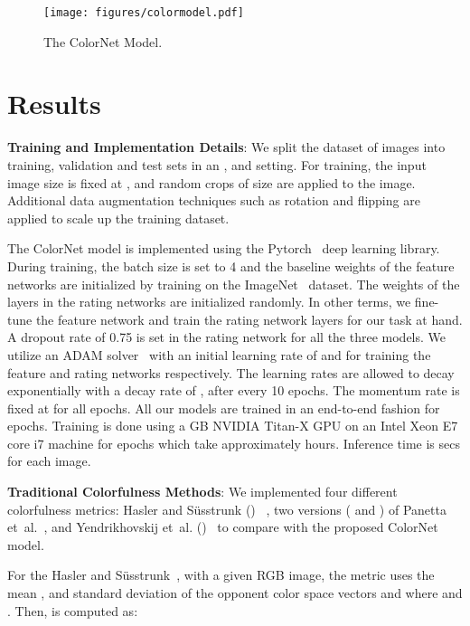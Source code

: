 \documentclass{article}
\begin{document}
\begin{figure}[tb]
    \centering
    \texttt{[image: figures/colormodel.pdf]}
  \caption{The ColorNet Model.}
  \label{fig:model}
  \vspace{-4pt}
\end{figure}
 

\section{Results}
\label{sec:results}
\textbf{Training and Implementation Details}: 
We split the dataset of  images into training, validation and test sets in an ,  and  setting. For training, the input image size is fixed at , and random crops of size  are applied to the image. Additional data augmentation techniques such as rotation and flipping are applied to scale up the training dataset. 

The ColorNet model is implemented using the Pytorch~\cite{paszke2017automatic} deep learning library. During training, the batch size is set to 4 and the baseline weights of the feature networks are initialized by training on the ImageNet~\cite{imagenet_cvpr09} dataset. The weights of the layers in the rating networks are initialized randomly. In other terms, we fine-tune the feature network and train the rating network layers for our task at hand. A dropout rate of 0.75 is set in the rating network for all the three models. We utilize an ADAM solver~\cite{KingmaB14adam2} with an initial learning rate of  and  for training the feature and rating networks respectively. The learning rates are allowed to decay exponentially with a decay rate of , after every 10 epochs. The momentum rate is fixed at  for all epochs. All our models are trained in an end-to-end fashion for  epochs. 
Training is done using a  GB NVIDIA Titan-X GPU on an Intel Xeon E7 core i7 machine for  epochs which take approximately  hours. Inference time is  secs for each image. 

\textbf{Traditional Colorfulness Methods}: 
We implemented four different colorfulness metrics: Hasler and S\"usstrunk ()~\cite{hasler2003measuring} , two versions ( and ) of Panetta et~al.~\cite{panetta2013no}, and Yendrikhovskij et~al.  ()~\cite{yendrikhovskij1998optimizing} to compare with the proposed ColorNet model. 

For the Hasler and S\"usstrunk~\cite{hasler2003measuring}, with a given RGB image, the metric uses the mean , and standard deviation  of the opponent color space vectors  and  where  and . Then,  is computed as:
\end{document}
